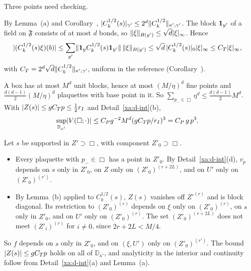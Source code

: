 \begin{detail}\label{xa:d-VBox}
Three points need checking.
\begin{step}
By Lemma~(a) and Corollary~, $\lvert C_k^{1/2}(s)\rvert_{\gamma'}\le2^d\lVert C_k^{1/2}\rVert_{\kappa',\gamma'}$. The block $\mathbf 1_{y'}$ of a field on $\mathfrak F$ consists of at most $d$ bonds, so $\lVert\xi\rVert_{B(y')}\le\sqrt d\lvert\xi\rvert_\infty$. Hence
\[
\lvert(C_k^{1/2}(s)\xi)(b)\rvert\le\sum_{y'}\lVert\mathbf 1_yC_k^{1/2}(s)\mathbf 1_{y'}\rVert\,\lVert\xi\rVert_{B(y')}\le\sqrt d\,\lvert C_k^{1/2}(s)\rvert_0\lvert\xi\rvert_\infty\le C_T\lvert\xi\rvert_\infty,
\]
with $C_T=2^d\sqrt d\lVert C_k^{1/2}\rVert_{\kappa',\gamma'}$, uniform in the reference (Corollary~).
\end{step}

\begin{step}
A box has at most $M^d$ unit blocks, hence at most $(M/\eta)^d$ fine points and $\frac{d(d-1)}2(M/\eta)^d$ plaquettes with base point in it. So $\sum_{p_-\in\Box}\eta^d\le\frac{d(d-1)}2M^d$. With $\lvert Z(s)\rvert\le gC_Tp\le\frac12r_I$ and Detail~\ref{xa:d-int}(b),
\[
\sup_{\mathbb D_{\kappa'}}\lvert V(\Box;\cdot)\rvert\le C_Pg^{-2}M^d(gC_Tp/r_I)^3=C_P\,g\,p^3 .
\]
\end{step}

\begin{step}[The hypotheses of Lemma~\Nref{lem:localization} for $f=V(\Box;\cdot)$ on $\mathbb D_{\kappa'}$, with $Y=\Box$]
Let $s$ be supported in $Z'\supset\Box$, with component $Z'_0\supset\Box$.
\begin{itemize}
\item Every plaquette with $p_-\in\Box$ has a point in $Z'_0$. By Detail~\ref{xa:d-int}(d), $v_p$ depends on $s$ only in $Z'_0$, on $Z$ only on $(Z'_0)^{(r+2L)}$, and on $U'$ only on $(Z'_0)^{(r')}$.
\item By Lemma~(b) applied to $C_k^{1/2}(s)$, $Z(s)$ vanishes off $Z'^{(r)}$ and is block diagonal. Its restriction to $(Z'_0)^{(r)}$ depends on $\xi$ only on $(Z'_0)^{(r)}$, on $s$ only in $Z'_0$, and on $U'$ only on $(Z'_0)^{(r)}$. The set $(Z'_0)^{(r+2L)}$ does not meet $(Z'_i)^{(r)}$ for $i\ne0$, since $2r+2L<M/4$.
\end{itemize}
So $f$ depends on $s$ only in $Z'_0$, and on $(\xi,U')$ only on $(Z'_0)^{(r')}$. The bound $\lvert Z(s)\rvert\le gC_Tp$ holds on all of $\mathbb D_{\kappa'}$, and analyticity in the interior and continuity follow from Detail~\ref{xa:d-int}(a) and Lemma~(a).
\end{step}
\end{detail}

